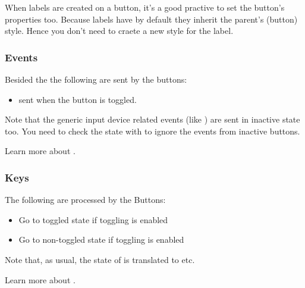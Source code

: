 \documentclass[letterpaper,10pt,english]{sphinxmanual}
\begin{document}
When labels are created on a button, it’s a good practive to set the button’s  properties too. Because labels have  by default they inherit the parent’s (button) style.
Hence you don’t need to craete a new style for the label.


\subsubsection{Events}
\label{\detokenize{object-types/btn:events}}
Besided the  the following  are sent by the buttons:
\begin{itemize}
\item {} 
 sent when the button is toggled.

\end{itemize}

Note that the generic input device related events (like ) are sent in inactive state too. You need to check the state with  to ignore the events from inactive buttons.

Learn more about {\hyperref[\detokenize{overview/events::doc}]{}}.


\subsubsection{Keys}
\label{\detokenize{object-types/btn:keys}}
The following  are processed by the Buttons:
\begin{itemize}
\item {} 
 Go to toggled state if toggling is enabled

\item {} 
 Go to non-toggled state if toggling is  enabled

\end{itemize}

Note that, as usual, the state of  is translated to  etc.

Learn more about {\hyperref[\detokenize{overview/indev::doc}]{}}.
\end{document}
